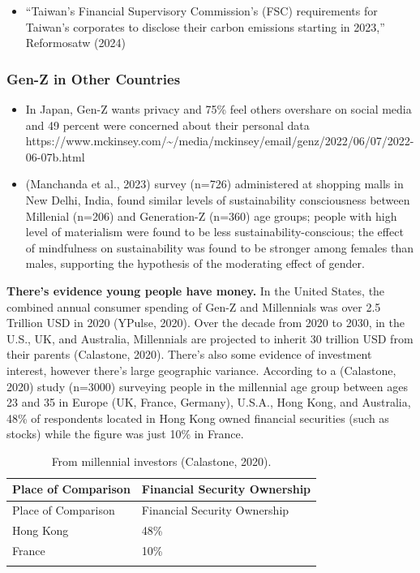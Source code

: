 \documentclass[
  letterpaper,
  DIV=11,
  numbers=noendperiod]{scrartcl}
\providecommand{\tightlist}{%
  \setlength{\itemsep}{0pt}\setlength{\parskip}{0pt}}\usepackage{longtable,booktabs,array}
\begin{document}
\begin{itemize}
\tightlist
\item
  ``Taiwan's Financial Supervisory Commission's (FSC) requirements for
  Taiwan's corporates to disclose their carbon emissions starting in
  2023,'' Reformosatw (2024)
\end{itemize}

\subsubsection{Gen-Z in Other Countries}\label{gen-z-in-other-countries}

\begin{itemize}
\item
  In Japan, Gen-Z wants privacy and 75\% feel others overshare on social
  media and 49 percent were concerned about their personal data
  https://www.mckinsey.com/\textasciitilde/media/mckinsey/email/genz/2022/06/07/2022-06-07b.html
\item
  (Manchanda et al., 2023) survey (n=726) administered at shopping malls
  in New Delhi, India, found similar levels of sustainability
  consciousness between Millenial (n=206) and Generation-Z (n=360) age
  groups; people with high level of materialism were found to be less
  sustainability-conscious; the effect of mindfulness on sustainability
  was found to be stronger among females than males, supporting the
  hypothesis of the moderating effect of gender.
\end{itemize}

\textbf{There's evidence young people have money.} In the United States,
the combined annual consumer spending of Gen-Z and Millennials was over
2.5 Trillion USD in 2020 (YPulse, 2020). Over the decade from 2020 to
2030, in the U.S., UK, and Australia, Millennials are projected to
inherit 30 trillion USD from their parents (Calastone, 2020). There's
also some evidence of investment interest, however there's large
geographic variance. According to a (Calastone, 2020) study (n=3000)
surveying people in the millennial age group between ages 23 and 35 in
Europe (UK, France, Germany), U.S.A., Hong Kong, and Australia, 48\% of
respondents located in Hong Kong owned financial securities (such as
stocks) while the figure was just 10\% in France.

\begin{longtable}[]{@{}ll@{}}
\caption{From millennial investors (Calastone, 2020).}\tabularnewline
\toprule\noalign{}
Place of Comparison & Financial Security Ownership \\
\midrule\noalign{}
\endfirsthead
\toprule\noalign{}
Place of Comparison & Financial Security Ownership \\
\midrule\noalign{}
\endhead
\bottomrule\noalign{}
\endlastfoot
Hong Kong & 48\% \\
France & 10\% \\
& \\
\end{longtable}
\end{document}
